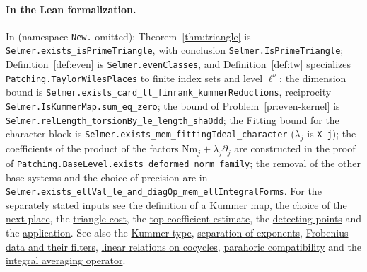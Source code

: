 \documentclass[reqno]{amsart}
\theoremstyle{definition}
\theoremstyle{plain}
\newcommand{\Nm}{\mathrm{Nm}}
\begin{document}
{\paragraph{In the Lean formalization.}
In \cite{GL} (namespace \texttt{New.} omitted): Theorem~\ref{thm:triangle} is \texttt{Selmer.exists\_isPrimeTriangle}, with conclusion \texttt{Selmer.IsPrimeTriangle}; Definition~\ref{def:even} is \texttt{Selmer.evenClasses}, and Definition~\ref{def:tw} specializes \texttt{Patching.TaylorWilesPlaces} to finite index sets and level \(\ell^\nu\); the dimension bound is \texttt{Selmer.exists\_card\_lt\_finrank\_kummerReductions}, reciprocity \texttt{Selmer.IsKummerMap.sum\_eq\_zero}; the bound of Problem~\ref{pr:even-kernel} is \texttt{Selmer.relLength\_torsionBy\_le\_length\_shaOdd}; the Fitting bound for the character block is \texttt{Selmer.exists\_mem\_fittingIdeal\_character} (\(\lambda_j\) is \texttt{X j}); the coefficients of the product of the factors \(\Nm_j + \lambda_j\partial_j\) are constructed in the proof of \texttt{Patching.BaseLevel.exists\_deformed\_norm\_family}; the removal of the other base systems and the choice of precision are in \texttt{Selmer.exists\_ellVal\_le\_and\_diagOp\_mem\_ellIntegralForms}.  For the separately stated inputs see the \href{https://github.com/lsernau/grh-lean/blob/72fead1/grh/src/New/Congruences/FirstOrder/KummerMaps.lean\#L413}{definition of a Kummer map}, the \href{https://github.com/lsernau/grh-lean/blob/72fead1/grh/src/New/Congruences/FirstOrder/TrianglePrimes.lean\#L417}{choice of the next place}, the \href{https://github.com/lsernau/grh-lean/blob/72fead1/grh/src/New/Congruences/FirstOrder/TateTwistCocycles.lean\#L232}{triangle cost}, the \href{https://github.com/lsernau/grh-lean/blob/72fead1/grh/src/New/Congruences/FirstOrder/AuxiliaryPrimeTie.lean\#L449}{top-coefficient estimate}, the \href{https://github.com/lsernau/grh-lean/blob/72fead1/grh/src/Lib/Cyclotomic/OddSha.lean\#L264}{detecting points} and the \href{https://github.com/lsernau/grh-lean/blob/72fead1/grh/src/New/Congruences/FirstOrder/DenominatorBound.lean\#L297}{application}.  See also the \href{https://github.com/lsernau/grh-lean/blob/72fead1/grh/src/New/Congruences/FirstOrder/KummerMaps.lean\#L423}{Kummer type}, \href{https://github.com/lsernau/grh-lean/blob/72fead1/grh/src/New/Congruences/FirstOrder/TrianglePrimes.lean\#L176}{separation of exponents}, \href{https://github.com/lsernau/grh-lean/blob/72fead1/grh/src/Lib/GaloisRep/Main/Defs.lean\#L192}{Frobenius data and their filters}, \href{https://github.com/lsernau/grh-lean/blob/72fead1/grh/src/New/Congruences/LocalLoss/Basic.lean\#L359}{linear relations on cocycles}, \href{https://github.com/lsernau/grh-lean/blob/72fead1/grh/src/New/Congruences/FirstOrder/TiedTraces.lean\#L516}{parahoric compatibility} and the \href{https://github.com/lsernau/grh-lean/blob/72fead1/grh/src/Lib/GaloisRep/TaylorWiles.lean\#L778}{integral averaging operator}.\par}
\end{document}
